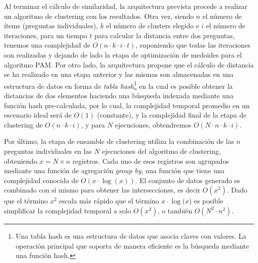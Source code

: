 \bigskip Al terminar el cálculo de similaridad, la arquitectura prevista procede a realizar un algoritmo de clustering con los resultados. Otra vez, siendo \(n\) el número de ítems (preguntas individuales), \(k\) el número de clusters elegido e \(i\) el número de iteraciones, para un tiempo \(t\) para calcular la distancia entre dos preguntas, tenemos una complejidad de \(O(n \cdot k \cdot i \cdot t)\), suponiendo que todas las iteraciones son realizadas y dejando de lado la etapa de optimización de medoides para el algoritmo PAM. Por otro lado, la arquitectura propone que el cálculo de distancia se ha realizado en una etapa anterior y las mismas son almacenadas en una estructura de datos en forma de \textit{tabla hash}\footnote{Una tabla hash es una estructura de datos que asocia claves con valores. La operación principal que soporta de manera eficiente es la búsqueda mediante una función hash.} en la cual es posible obtener la distancias de dos elementos haciendo una búsqueda indexada mediante una función hash pre-calculada, por lo cual, la complejidad temporal promedio en un escenario ideal será de \(O(1)\) (constante), y la complejidad final de la etapa de clustering de \(O(n \cdot k \cdot i)\), y para \(N\) ejecuciones, obtendremos \(O(N \cdot n \cdot k \cdot i)\).

\bigskip Por último, la etapa de ensamble de clustering utiliza la combinación de las \(n\) preguntas individuales en las \(N\) ejecuciones del algoritmo de clustering, obteniendo \(x = N \times n\) registros. Cada uno de esos registros son agrupados mediante una función de agregación \textit{group by}, una función que tiene una complejidad conocida de  \(O(x \cdot \log(x))\). El conjunto de datos generado es combinado con sí mismo para obtener las intersecciones, es decir \(O(x^2)\). Dado que el término \(x^2\) escala más rápido que el término \(x \cdot \log(x\)) es posible simplificar la complejidad temporal a solo \(O(x^2)\), o también \(O(N^2 \cdot n^2)\).

